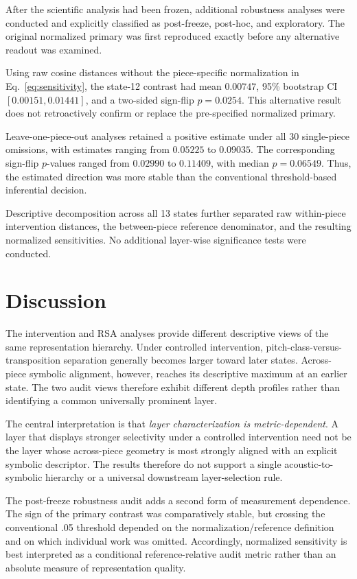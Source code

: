\documentclass[conference]{IEEEtran}
\begin{document}
After the scientific analysis had been frozen, additional robustness analyses
were conducted and explicitly classified as post-freeze, post-hoc, and
exploratory.
The original normalized primary was first reproduced exactly before any
alternative readout was examined.

Using raw cosine distances without the piece-specific normalization in
Eq.~\eqref{eq:sensitivity}, the state-12 contrast had mean $0.00747$,
95\% bootstrap CI $[0.00151, 0.01441]$, and a two-sided sign-flip
$p=0.0254$.
This alternative result does not retroactively confirm or replace the
pre-specified normalized primary.

Leave-one-piece-out analyses retained a positive estimate under all 30
single-piece omissions, with estimates ranging from $0.05225$ to $0.09035$.
The corresponding sign-flip $p$-values ranged from $0.02990$ to $0.11409$,
with median $p=0.06549$.
Thus, the estimated direction was more stable than the conventional
threshold-based inferential decision.

Descriptive decomposition across all 13 states further separated raw
within-piece intervention distances, the between-piece reference denominator,
and the resulting normalized sensitivities.
No additional layer-wise significance tests were conducted.

\section{Discussion}

The intervention and RSA analyses provide different descriptive views of the
same representation hierarchy.
Under controlled intervention, pitch-class-versus-transposition separation
generally becomes larger toward later states.
Across-piece symbolic alignment, however, reaches its descriptive maximum at
an earlier state.
The two audit views therefore exhibit different depth profiles rather than
identifying a common universally prominent layer.

The central interpretation is that \emph{layer characterization is
metric-dependent}.
A layer that displays stronger selectivity under a controlled intervention
need not be the layer whose across-piece geometry is most strongly aligned
with an explicit symbolic descriptor.
The results therefore do not support a single acoustic-to-symbolic hierarchy
or a universal downstream layer-selection rule.

The post-freeze robustness audit adds a second form of measurement dependence.
The sign of the primary contrast was comparatively stable, but crossing the
conventional .05 threshold depended on the normalization/reference definition
and on which individual work was omitted.
Accordingly, normalized sensitivity is best interpreted as a conditional
reference-relative audit metric rather than an absolute measure of
representation quality.
\end{document}

